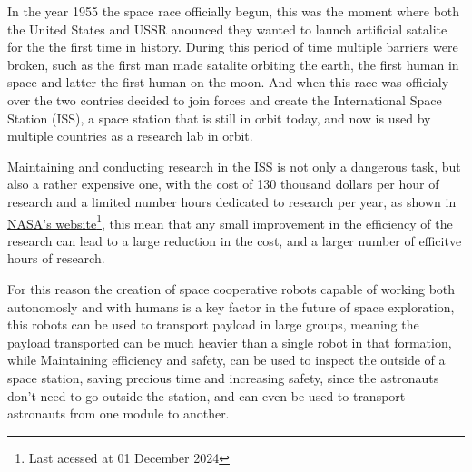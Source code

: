 In the year 1955 the space race officially begun, this was the moment where both the United States and USSR anounced they wanted to launch artificial satalite for the the first time in history. During this period of time multiple barriers were broken, such as the first man made satalite orbiting the earth, the first human in space and latter the first human on the moon. And when this race was officialy over the two contries decided to join forces and create the International Space Station (ISS), a space station that is still in orbit today, and now is used by multiple countries as a research lab in orbit.

Maintaining and conducting research in the ISS is not only a dangerous task, but also a rather expensive one, with the cost of 130 thousand dollars per hour of research and a limited number hours dedicated to research per year, as shown in  \href{https://www.nasa.gov/humans-in-space/commercial-and-marketing-pricing-policy/}{NASA's website}\footnote{Last acessed at 01 December 2024}, this mean that any small improvement in the efficiency of the research can lead to a large reduction in the cost, and a larger number of efficitve hours of research.

For this reason the creation of space cooperative robots capable of working both autonomosly and with humans is a key factor in the future of space exploration, this robots can be used to transport payload in large groups, meaning the payload transported can be much heavier than a single robot in that formation, while Maintaining efficiency and safety, can be used to inspect the outside of a space station, saving precious time and increasing safety, since the astronauts don't need to go outside the station, and can even be used to transport astronauts from one module to another. 